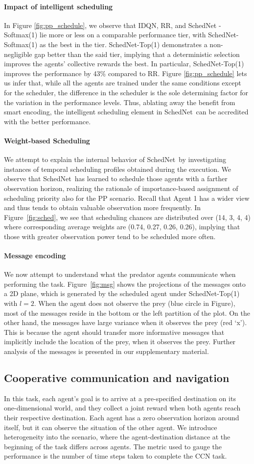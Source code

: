 \documentclass{article} %
\newcommand{\sched}{SchedNet}
\newcommand{\myparagraph}[1]{\vspace{-0.25cm} \paragraph{#1}}
\begin{document}
\myparagraph{Impact of intelligent scheduling} In Figure
\ref{fig:pp_schedule}, we observe that IDQN, RR, and \sched
-Softmax(1) lie more or less on a comparable performance tier, with
\sched -Softmax(1) as the best in the tier.  \sched -Top(1)
demonstrates a non-negligible gap better than the said tier, implying
that a deterministic selection improves the agents' collective rewards
the best. In particular, \sched -Top(1) improves the performance by
43\% compared to RR. Figure \ref{fig:pp_schedule} lets us infer that,
while all the agents are trained under the same conditions except for
the scheduler, the difference in the scheduler is the sole determining
factor for the variation in the performance levels. Thus, ablating away
the benefit from smart encoding, the intelligent scheduling element in
\sched~can be accredited with the better performance.


\myparagraph{Weight-based Scheduling}
We attempt to explain the internal behavior of \sched~by investigating
instances of temporal scheduling profiles obtained during the
execution.  We observe that \sched~has learned to schedule those agents
with a farther observation horizon, realizing the rationale of
importance-based assignment of scheduling priority also for the PP
scenario. Recall that Agent 1 has a wider view and thus tends to
obtain valuable observation more frequently. In
Figure~\ref{fig:sched}, we see that scheduling chances are distributed
over (14, 3, 4, 4) where corresponding average 
weights are (0.74,
0.27, 0.26, 0.26), implying that those with greater observation power
tend to be scheduled more often.

\myparagraph{Message encoding} 



We now attempt to understand what the predator agents communicate when
performing the task. Figure~\ref{fig:msg} shows the projections of the
messages onto a 2D plane, which is generated by the scheduled agent
under \sched -Top(1) with $l=2$. When the agent does not observe the
prey (blue circle in Figure), most of the messages reside in the
bottom or the left partition of the plot. On the other hand, the
messages have large variance when it observes the prey (red `x'). This
is because the agent should transfer more informative messages that
implicitly include the location of the prey, when it observes the
prey. Further analysis of the messages is presented in our
supplementary material.

\subsection{Cooperative communication and navigation}
In this task, each agent's goal is to arrive at a pre-specified
destination on its one-dimensional world, and they collect a joint
reward when both agents reach their respective destination. Each agent has a zero
observation horizon around itself, but it can observe the situation of
the other agent. We introduce heterogeneity into the scenario, where
the agent-destination distance at the beginning of the task differs
across agents. The metric used to gauge the performance is the number
of time steps taken to complete the CCN task.
\end{document}
